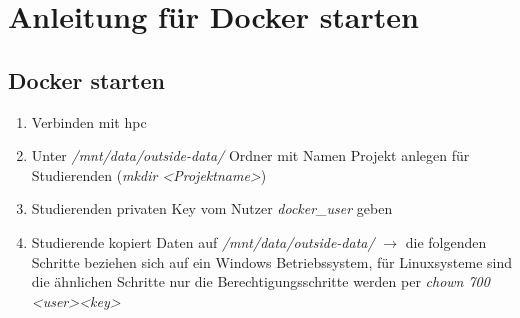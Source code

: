 \chapter{Anleitung für Docker starten}
\section{Docker starten}
\begin{enumerate}
    \item Verbinden mit \ac{hpc} 
    \item Unter \textit{/mnt/data/outside-data/} Ordner mit Namen Projekt anlegen für Studierenden (\textit{mkdir \textless Projektname\textgreater}) 
    \item Studierenden privaten Key vom Nutzer \textit{docker\_user} geben
    \item Studierende kopiert Daten auf \textit{/mnt/data/outside-data/} $\rightarrow$ die folgenden Schritte beziehen sich auf ein Windows Betriebssystem, für Linuxsysteme sind die ähnlichen Schritte nur die Berechtigungsschritte werden per \textit{chown 700 \textless user\textgreater \textless key\textgreater}
    

\end{enumerate}
